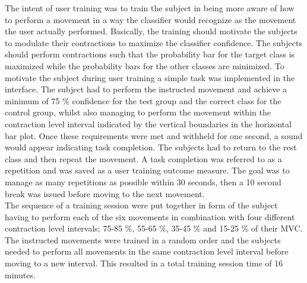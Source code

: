 The intent of user training was to train the subject in being more aware of how to perform a movement in a way the classifier would recognize as the movement the user actually performed. Basically, the training should motivate the subjects to modulate their contractions to maximize the classifier confidence. The subjects should perform contractions such that the probability bar for the target class is maximized while the probability bars for the other classes are minimized. To motivate the subject during user training a simple task was implemented in the interface. The subject had to perform the instructed movement and achieve a minimum of 75 \% confidence for the test group and the correct class for the control group, whilst also managing to perform the movement within the contraction level interval indicated by the vertical boundaries in the horizontal bar plot. Once these requirements were met and withheld for one second, a sound would appear indicating task completion. The subjects had to return to the rest class and then repeat the movement. A task completion was referred to as a repetition and was saved as a user training outcome measure. The goal was to manage as many repetitions as possible within 30 seconds, then a 10 second break was issued before moving to the next movement. \\
The sequence of a training session were put together in form of the subject having to perform each of the six movements in combination with four different contraction level intervals; 75-85 \%, 55-65 \%, 35-45 \% and 15-25 \% of their MVC. The instructed movements were trained in a random order and the subjects needed to perform all movements in the same contraction level interval before moving to a new interval. This resulted in a total training session time of 16 minutes.         


